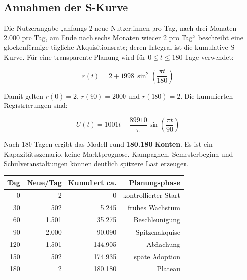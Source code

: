 \documentclass[10pt,a4paper,oneside]{article}
\begin{document}
\subsection{Annahmen der S-Kurve}

Die Nutzerangabe „anfangs 2 neue Nutzer:innen pro Tag, nach drei Monaten 2.000 pro Tag, am Ende nach sechs Monaten wieder 2 pro Tag“ beschreibt eine glockenförmige tägliche Akquisitionsrate; deren Integral ist die kumulative S-Kurve. Für eine transparente Planung wird für $0 \leq t \leq 180$ Tage verwendet:

\[
r(t)=2+1998\,\sin^2\!\left(\frac{\pi t}{180}\right)
\]

Damit gelten $r(0)=2$, $r(90)=2000$ und $r(180)=2$. Die kumulierten Registrierungen sind:

\[
U(t)=1001t-\frac{89910}{\pi}\sin\!\left(\frac{\pi t}{90}\right)
\]

Nach 180 Tagen ergibt das Modell rund \textbf{180.180 Konten}. Es ist ein Kapazitätsszenario, keine Marktprognose. Kampagnen, Semesterbeginn und Schulveranstaltungen können deutlich spitzere Last erzeugen.

\begin{center}
\end{center}

\begin{table}[htbp]
\centering
\begin{tabular}{rrrr}
\toprule
\textbf{Tag} & \textbf{Neue/Tag} & \textbf{Kumuliert ca.} & \textbf{Planungsphase} \\
\midrule
0 & 2 & 0 & kontrollierter Start \\
30 & 502 & 5.245 & frühes Wachstum \\
60 & 1.501 & 35.275 & Beschleunigung \\
90 & 2.000 & 90.090 & Spitzenakquise \\
120 & 1.501 & 144.905 & Abflachung \\
150 & 502 & 174.935 & späte Adoption \\
180 & 2 & 180.180 & Plateau \\
\bottomrule
\end{tabular}
\end{table}
\end{document}
